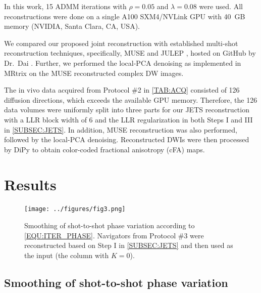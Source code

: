 \documentclass[preprint,12pt,authoryear,review]{elsarticle}
\begin{document}
    In this work, 15 ADMM iterations with $\rho = 0.05$
    and $\lambda = 0.08$ were used.
    All reconstructions were done on a single A100 SXM4/NVLink GPU
    with \SI{40}{GB} memory (NVIDIA, Santa Clara, CA, USA).

    We compared our proposed joint reconstruction
    with established multi-shot reconstruction techniques,
    specifically, MUSE \citep{chen_2013_muse}
    and JULEP \citep{dai_2023_julep},
    hosted on GitHub by Dr.~Dai \citep{dai_2023_julep}.
    Further, we performed
    the local-PCA denoising \citep{cordero_2019_cplxdwi}
    as implemented in MRtrix \citep{Tournier_2019_mrtrix}
    on the MUSE reconstructed complex DW images.

    The in vivo data acquired from Protocol \#2 in \cref{TAB:ACQ}
    consisted of 126 diffusion directions,
    which exceeds the available GPU memory.
    Therefore, the 126 data volumes were uniformly split
    into three parts for our JETS reconstruction
    with a LLR block width of 6 and the LLR regularization
    in both Steps I and III in \cref{SUBSEC:JETS}.
    In addition, MUSE reconstruction was also performed,
    followed by the local-PCA denoising.
    Reconstructed DWIs were then processed
    by DiPy \citep{garyfallidis_2014_dipy}
    to obtain color-coded fractional anisotropy (cFA) maps.

    \pagebreak

    \section{Results}
    \label{SEC_Resl}

    \begin{figure}
        \centering
        \texttt{[image: ../figures/fig3.png]}
        \caption{Smoothing of shot-to-shot phase variation
        according to \cref{EQU:ITER_PHASE}.
        Navigators from Protocol \#3 were reconstructed
        based on Step I in \cref{SUBSEC:JETS}
        and then used as the input (the column with $K = 0$).}
        \label{FIG:iter_phase}
    \end{figure}

    \subsection{Smoothing of shot-to-shot phase variation}
\end{document}
